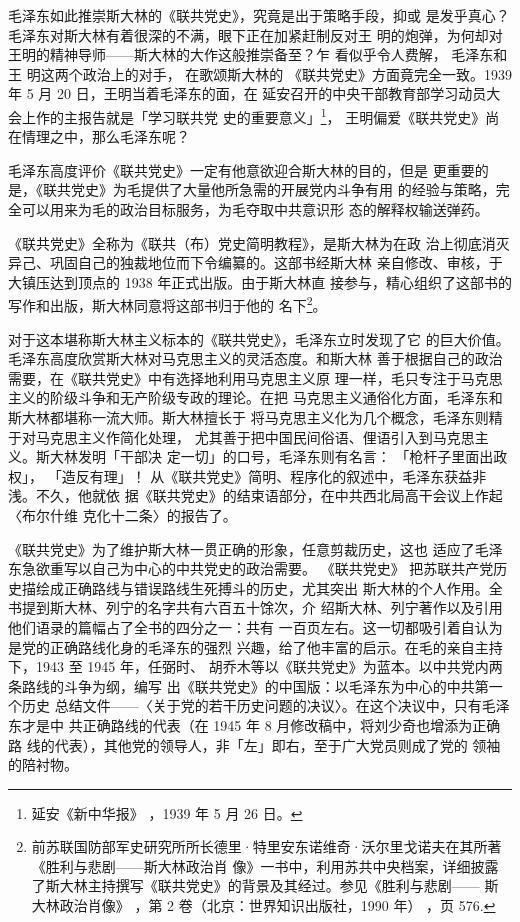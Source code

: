 毛泽东如此推崇斯大林的《联共党史》，究竟是出于策略手段，抑或 是发乎真心？
毛泽东对斯大林有着很深的不满，眼下正在加紧赶制反对王 明的炮弹，为何却对
王明的精神导师——斯大林的大作这般推崇备至？乍 看似乎令人费解， 毛泽东和王
明这两个政治上的对手， 在歌颂斯大林的 《联共党史》方面竟完全一致。1939
年 5 月 20 日，王明当着毛泽东的面，在 延安召开的中央干部教育部学习动员大
会上作的主报告就是「学习联共党 史的重要意义」\footnote{延安《新中华报》
，1939 年 5 月 26 日。}， 王明偏爱《联共党史》尚在情理之中，那么毛泽东呢？

毛泽东高度评价《联共党史》一定有他意欲迎合斯大林的目的，但是
更重要的是，《联共党史》为毛提供了大量他所急需的开展党内斗争有用
的经验与策略，完全可以用来为毛的政治目标服务，为毛夺取中共意识形
态的解释权输送弹药。

《联共党史》全称为《联共（布）党史简明教程》，是斯大林为在政
治上彻底消灭异己、巩固自己的独裁地位而下令编纂的。这部书经斯大林
亲自修改、审核，于大镇压达到顶点的 1938 年正式出版。由于斯大林直
接参与，精心组织了这部书的写作和出版，斯大林同意将这部书归于他的
名下\footnote{前苏联国防部军史研究所所长德里·特里安东诺维奇·沃尔里戈诺夫在其所著《胜利与悲剧——斯大林政治肖
像》一书中，利用苏共中央档案，详细披露了斯大林主持撰写《联共党史》的背景及其经过。参见《胜利与悲剧——
斯大林政治肖像》
，第 2 卷（北京：世界知识出版社，1990 年）
，页 576.}。

对于这本堪称斯大林主义标本的《联共党史》，毛泽东立时发现了它
的巨大价值。毛泽东高度欣赏斯大林对马克思主义的灵活态度。和斯大林
善于根据自己的政治需要，在《联共党史》中有选择地利用马克思主义原
理一样，毛只专注于马克思主义的阶级斗争和无产阶级专政的理论。在把
马克思主义通俗化方面，毛泽东和斯大林都堪称一流大师。斯大林擅长于
将马克思主义化为几个概念，毛泽东则精于对马克思主义作简化处理，
尤其善于把中国民间俗语、俚语引入到马克思主义。斯大林发明「干部决
定一切」的口号，毛泽东则有名言：
「枪杆子里面出政权」，
「造反有理」！
从《联共党史》简明、程序化的叙述中，毛泽东获益非浅。不久，他就依
据《联共党史》的结束语部分，在中共西北局高干会议上作起〈布尔什维
克化十二条〉的报告了。
 
《联共党史》为了维护斯大林一贯正确的形象，任意剪裁历史，这也
适应了毛泽东急欲重写以自己为中心的中共党史的政治需要。
《联共党史》
把苏联共产党历史描绘成正确路线与错误路线生死搏斗的历史，尤其突出
斯大林的个人作用。全书提到斯大林、列宁的名字共有六百五十馀次，介
绍斯大林、列宁著作以及引用他们语录的篇幅占了全书的四分之一：共有
一百页左右。这一切都吸引着自认为是党的正确路线化身的毛泽东的强烈
兴趣，给了他丰富的启示。在毛的亲自主持下，1943 至 1945 年，任弼时、
胡乔木等以《联共党史》为蓝本。以中共党内两条路线的斗争为纲，编写
出《联共党史》的中国版：以毛泽东为中心的中共第一个历史
总结文件——〈关于党的若干历史问题的决议〉。在这个决议中，只有毛泽东才是中
共正确路线的代表（在 1945 年 8 月修改稿中，将刘少奇也增添为正确路
线的代表），其他党的领导人，非「左」即右，至于广大党员则成了党的
领袖的陪衬物。

